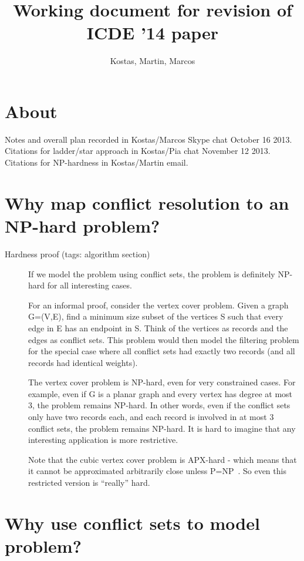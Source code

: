 \documentclass[11pt, oneside]{article}   	%
\title{Working document for revision of ICDE '14 paper}
\author{Kostas, Martin, Marcos}
\begin{document}
\maketitle

\section{About}
Notes and overall plan recorded in Kostas/Marcos Skype chat October 16 2013. Citations for ladder/star approach in Kostas/Pia chat November 12 2013. Citations for NP-hardness in Kostas/Martin email.

\section{Why map conflict resolution to an NP-hard problem?}


\begin{description}
\item[Hardness proof (tags: algorithm section)] If we model the problem using conflict sets, the problem is
definitely NP-hard for all interesting cases.

For an informal proof, consider the vertex cover problem. Given a graph G=(V,E),
find a minimum size subset of the vertices S such that every edge in E
has an endpoint in S. Think of the vertices as records and the edges
as conflict sets. This problem would then model the filtering problem
for the special case where all conflict sets had exactly two records
(and all records had identical weights).

The vertex cover problem is NP-hard, even for very constrained cases.
For example, even if G is a planar graph and every vertex has degree
at most 3, the problem remains NP-hard. In other words, even if the
conflict sets only have two records each, and each record is involved
in at most 3 conflict sets, the problem remains NP-hard. It is hard to
imagine that any interesting application is more restrictive.

Note that the cubic vertex cover problem is APX-hard - which
means that it cannot be approximated arbitrarily close unless P=NP~\cite{alimonti2000some}. So even this restricted version is ``really'' hard.
\end{description}



\section{Why use conflict sets to model problem?}
\end{document}
